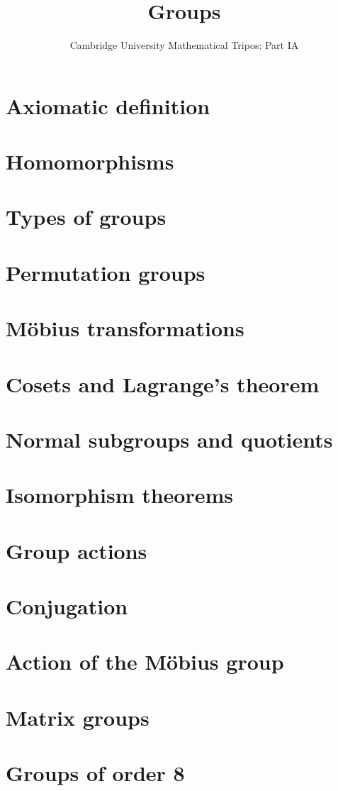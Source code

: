 \documentclass{article}
\title{Groups}
\author{Cambridge University Mathematical Tripos: Part IA}
\begin{document}
\maketitle

\tableofcontentsnewpage{}

\section{Axiomatic definition}

\section{Homomorphisms}

\section{Types of groups}

\section{Permutation groups}

\section{M\"obius transformations}

\section{Cosets and Lagrange's theorem}

\section{Normal subgroups and quotients}

\section{Isomorphism theorems}

\section{Group actions}

\section{Conjugation}

\section{Action of the M\"obius group}

\section{Matrix groups}

\section{Groups of order 8}

\end{document}
